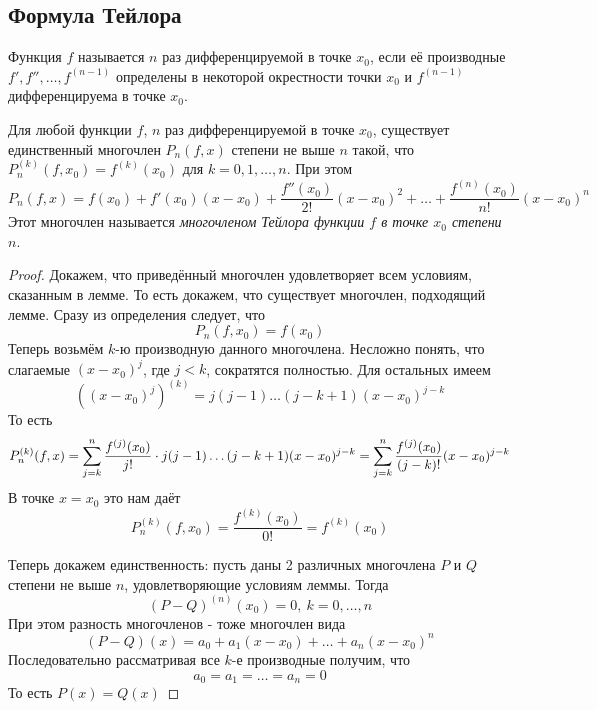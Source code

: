 
\subsection{Формула Тейлора}


\begin{definition}
	Функция $f$ называется $n$ раз дифференцируемой в точке $x_0$, если её производные $f', f'', \ldots, f^{(n - 1)}$ определены в некоторой окрестности точки $x_0$ и $f^{(n - 1)}$ дифференцируема в точке $x_0$.
\end{definition}

\begin{lemma}
	Для любой функции $f$, $n$ раз дифференцируемой в точке $x_0$, существует единственный многочлен $P_n(f, x)$ степени не выше $n$ такой, что $P_n^{(k)}(f, x_0) = f^{(k)}(x_0)$ для $k = 0, 1, \ldots, n$. При этом
	\[
		P_n(f, x) = f(x_0) + f'(x_0)(x - x_0) + \frac{f''(x_0)}{2!}(x - x_0)^2 + \ldots + \frac{f^{(n)}(x_0)}{n!}(x - x_0)^n
 	\]
 	Этот многочлен называется \textit{многочленом Тейлора функции $f$ в точке $x_0$ степени $n$}.
\end{lemma}

\begin{proof}
	Докажем, что приведённый многочлен удовлетворяет всем условиям, сказанным в лемме. То есть докажем, что существует многочлен, подходящий лемме. Сразу из определения следует, что
	\[
		P_n(f, x_0) = f(x_0)
	\]
	Теперь возьмём $k$-ю производную данного многочлена. Несложно понять, что слагаемые $(x - x_0)^j$, где $j < k$, сократятся полностью. Для остальных имеем
	\[
		\left((x - x_0)^j\right)^{(k)} = j(j - 1) \ldots (j - k + 1)(x - x_0)^{j - k}
	\]
	То есть
	\[
		P_n^{(k)}(f, x) = \sum\limits_{j = k}^n \frac{f^{(j)}(x_0)}{j!} \cdot j(j - 1) \ldots (j - k + 1)(x - x_0)^{j - k} = \sum\limits_{j = k}^n \frac{f^{(j)}(x_0)}{(j - k)!} (x - x_0)^{j - k}
	\]
	В точке $x = x_0$ это нам даёт
	\[
		P_n^{(k)}(f, x_0) = \frac{f^{(k)}(x_0)}{0!} = f^{(k)}(x_0)
	\]
	
	Теперь докажем единственность: пусть даны 2 различных многочлена $P$ и $Q$ степени не выше $n$, удовлетворяющие условиям леммы. Тогда
	\[
		(P - Q)^{(n)}(x_0) = 0,\ k = 0, \ldots, n
	\]
	При этом разность многочленов - тоже многочлен вида
	\[
		(P - Q)(x) = a_0 + a_1(x - x_0) + \ldots + a_n(x - x_0)^n
	\]
	Последовательно рассматривая все $k$-е производные получим, что
	\[
		a_0 = a_1 = \ldots = a_n = 0
	\]
	То есть $P(x) = Q(x)$
\end{proof}

